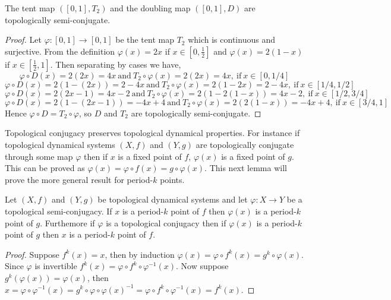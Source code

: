 \begin{prop} \label{prop:tent-doubling-semi-conjugate}
    The tent map $([0, 1], T_2)$ and the doubling map $([0, 1], D)$ are topologically semi-conjugate.
    \begin{proof}
        Let $\varphi: [0, 1] \to [0, 1]$ be the tent map $T_2$ which is continuous and surjective. From the definition $\varphi(x) = 2x$ if $x \in \left[0, \frac{1}{2}\right]$ and $\varphi(x) = 2(1-x)$ if $x \in \left[\frac{1}{2}, 1\right]$. Then separating by cases we have, \[\varphi \circ D(x) = 2(2x) = 4x \ \text{and} \ T_2 \circ \varphi(x) = 2(2x) = 4x, \ \text{if} \ x \in \left[0, 1/4\right]\] \[\varphi \circ D(x) = 2(1 - (2x)) = 2 - 4x \ \text{and} \ T_2 \circ \varphi(x) = 2(1-2x) = 2 - 4x, \ \text{if} \ x \in \left[1/4, 1/2\right]\] \[\varphi \circ D(x) = 2(2x-1) = 4x - 2 \ \text{and} \ T_2 \circ \varphi(x) = 2(1-2(1-x)) = 4x - 2, \ \text{if} \ x \in \left[1/2, 3/4\right]\] \[\varphi \circ D(x) = 2(1-(2x - 1)) = - 4x + 4 \ \text{and} \ T_2 \circ \varphi(x) = 2(2(1-x)) = -4x + 4, \ \text{if} \ x \in \left[3/4, 1\right]\] Hence $\varphi \circ D = T_2 \circ \varphi$, so $D$ and $T_2$ are topologically semi-conjugate.
    \end{proof}
\end{prop}

Topological conjugacy preserves topological dynamical properties. For instance if topological dynamical systems $(X, f)$ and $(Y, g)$ are topologically conjugate through some map $\varphi$ then if $x$ is a fixed point of $f$, $\varphi(x)$ is a fixed point of $g$. This can be proved as $\varphi(x) = \varphi \circ f(x) = g \circ \varphi(x)$. This next lemma will prove the more general result for period-$k$ points.

\begin{prop} \label{prop:conjugacy-preserves-periodic-points}
    Let $(X, f)$ and $(Y, g)$ be topological dynamical systems and let $\varphi: X \to Y$ be a topological semi-conjugacy. If $x$ is a period-$k$ point of $f$ then $\varphi(x)$ is a period-$k$ point of $g$. Furthemore if $\varphi$ is a topological conjugacy then if $\varphi(x)$ is a period-$k$ point of $g$ then $x$ is a period-$k$ point of $f.$
    \begin{proof}
        Suppose $f^k(x) = x$, then by induction $\varphi(x) = \varphi \circ f^k(x) = g^k \circ \varphi (x)$. Since $\varphi$ is invertible $f^k(x) = \varphi \circ f^k \circ \varphi^{-1}(x)$. Now suppose $g^k(\varphi(x)) = \varphi(x)$, then $x = \varphi \circ \varphi^{-1}(x) = g^k \circ \varphi \circ \varphi(x)^{-1} = \varphi \circ f^k \circ \varphi^{-1}(x) = f^k(x)$.
    \end{proof}
\end{prop}

